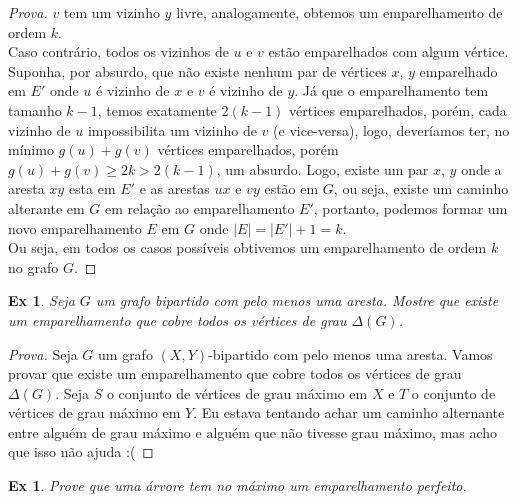 \documentclass[12pt]{article}
\newcounter{exCounter}
\newtheorem{ex}[exCounter]{Ex}
\begin{document}
\begin{proof}[Prova]
$v$ tem um vizinho $y$ livre, analogamente, obtemos um emparelhamento de ordem $k$. \\
Caso contrário, todos os vizinhos de $u$ e $v$ estão emparelhados com algum vértice. Suponha, por absurdo, que não existe nenhum par de vértices $x$, $y$ emparelhado em $E'$ onde $u$ é vizinho de $x$ e $v$ é vizinho de $y$. Já que o emparelhamento tem tamanho $k-1$, temos exatamente $2(k-1)$ vértices emparelhados, porém, cada vizinho de $u$ impossibilita um vizinho de $v$ (e vice-versa), logo, deveríamos ter, no mínimo $g(u) + g(v)$ vértices emparelhados, porém $g(u) + g(v) \geq 2k > 2(k-1)$, um absurdo. Logo, existe um par $x$, $y$ onde a aresta $xy$ esta em $E'$ e as arestas $ux$ e $vy$ estão em $G$, ou seja, existe um caminho alterante em $G$ em relação ao emparelhamento $E'$, portanto, podemos formar um novo emparelhamento $E$ em $G$ onde $|E| = |E'| + 1 = k$. \\
Ou seja, em todos os casos possíveis obtivemos um emparelhamento de ordem $k$ no grafo $G$.
\end{proof}

\begin{ex}
Seja $G$ um grafo bipartido com pelo menos uma aresta. Mostre que existe um emparelhamento que cobre todos os vértices de grau $\Delta(G)$.
\end{ex}

\begin{proof}[Prova]
Seja $G$ um grafo $(X,Y)$-bipartido com pelo menos uma aresta. Vamos provar que existe um emparelhamento que cobre todos os vértices de grau $\Delta(G)$. Seja $S$ o conjunto de vértices de grau máximo em $X$ e $T$ o conjunto de vértices de grau máximo em $Y$.
Eu estava tentando achar um caminho alternante entre alguém de grau máximo e alguém que não tivesse grau máximo, mas acho que isso não ajuda :(
\end{proof}

\begin{ex}
Prove que uma árvore tem no máximo um emparelhamento perfeito.
\end{ex}
\end{document}
